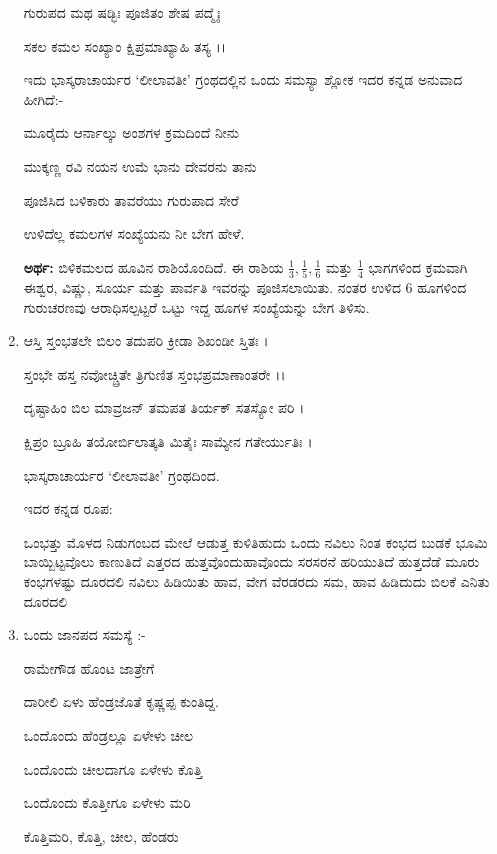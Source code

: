 \begin{enumerate}
 ಗುರುಪದ ಮಥ ಷಡ್ಭಿಃ ಪೂಜಿತಂ ಶೇಷ ಪದ್ಮೈಃ 
 
 ಸಕಲ ಕಮಲ ಸಂಖ್ಯಾಂ ಕ್ಷಿಪ್ರಮಾಖ್ಯಾಹಿ ತಸ್ಯ ।।
 
 \medskip
 
 ಇದು ಭಾಸ್ಕರಾಚಾರ್ಯರ ‘ಲೀಲಾವತೀ’ ಗ್ರಂಥದಲ್ಲಿನ ಒಂದು ಸಮಸ್ಯಾ ಶ್ಲೋಕ ಇದರ ಕನ್ನಡ ಅನುವಾದ ಹೀಗಿದೆ:-
 
 \smallskip
 
 ಮೂರೈದು ಆರ್ನಾಲ್ಕು ಅಂಶಗಳ ಕ್ರಮದಿಂದೆ ನೀನು
 
 ಮುಕ್ಕಣ್ಣ ರವಿ ನಯನ ಉಮೆ ಭಾನು ದೇವರನು ತಾನು 
 
 ಪೂಜಿಸಿದ ಬಳಿಕಾರು ತಾವರೆಯು ಗುರುಪಾದ ಸೇರೆ 
 
 ಉಳಿದೆಲ್ಲ ಕಮಲಗಳ ಸಂಖ್ಯೆಯನು ನೀ ಬೇಗ ಹೇಳೆ.
 
 \smallskip
 {\bf ಅರ್ಥ:} ಬಿಳಿಕಮಲದ ಹೂವಿನ ರಾಶಿಯೊಂದಿದೆ. ಈ ರಾಶಿಯ $\frac{1}{3}, \frac{1}{5}, \frac{1}{6}$ ಮತ್ತು $\frac{1}{4}$ ಭಾಗಗಳಿಂದ ಕ್ರಮವಾಗಿ ಈಶ್ವರ, ವಿಷ್ಣು, ಸೂರ್ಯ ಮತ್ತು ಪಾರ್ವತಿ ಇವರನ್ನು ಪೂಜಿಸಲಾಯಿತು. ನಂತರ ಉಳಿದ 6 ಹೂಗಳಿಂದ ಗುರುಚರಣವು ಆರಾಧಿಸಲ್ಪಟ್ಟರೆ ಒಟ್ಟು ಇದ್ದ ಹೂಗಳ ಸಂಖ್ಯೆಯನ್ನು ಬೇಗ ತಿಳಿಸು. 
 
 \eject
 
 \item ಆಸ್ತಿ ಸ್ತಂಭತಲೇ ಬಿಲಂ ತದುಪರಿ ಕ್ರೀಡಾ ಶಿಖಂಡೀ ಸ್ತಿತಃ ।
 
 ಸ್ತಂಭೇ ಹಸ್ತ ನವೋಚ್ಚ್ರಿತೇ ತ್ರಿಗುಣಿತ ಸ್ತಂಭಪ್ರಮಾಣಾಂತರೇ ।।
 
 ದೃಷ್ಟಾಹಿಂ ಬಿಲ ಮಾವ್ರಜನ್ ತಮಪತ ತಿರ್ಯಕ್ ಸತಸ್ಯೋ ಪರಿ ।
 
 ಕ್ಷಿಪ್ರಂ ಬ್ರೂಹಿ ತಯೋರ್ಬಿಲಾತ್ಕತಿ ಮಿತೈಃ ಸಾಮ್ಯೇನ ಗತೇರ್ಯುತಿಃ ।
 
 \hfill ಭಾಸ್ಕರಾಚಾರ್ಯರ ‘ಲೀಲಾವತೀ’ ಗ್ರಂಥದಿಂದ.
  
 \smallskip
 
 ಇದರ ಕನ್ನಡ ರೂಪ:
 
 \smallskip
 
 ಒಂಭತ್ತು ಮೊಳದ ನಿಡುಗಂಬದ ಮೇಲೆ ಆಡುತ್ತ ಕುಳಿತಿಹುದು ಒಂದು ನವಿಲು ನಿಂತ ಕಂಭದ ಬುಡಕೆ ಭೂಮಿ ಬಾಯ್ಬಿಟ್ಟವೊಲು ಕಾಣುತಿದೆ ಎತ್ತರದ ಹುತ್ತವೊಂದು\break ಹಾವೊಂದು ಸರಸರನೆ ಹರಿಯುತಿದೆ ಹುತ್ತದೆಡೆ ಮೂರು ಕಂಭಗಳಷ್ಟು ದೂರದಲಿ ನವಿಲು ಹಿಡಿಯಿತು ಹಾವ, ವೇಗ ವೆರಡರದು ಸಮ, ಹಾವ ಹಿಡಿದುದು ಬಿಲಕೆ ಎನಿತು ದೂರದಲಿ
 
 \item ಒಂದು ಜಾನಪದ ಸಮಸ್ಯೆ :-
 
\smallskip

ರಾಮೇಗೌಡ ಹೊಂಟ ಜಾತ್ರೇಗೆ 
 
ದಾರೀಲಿ ಏಳು ಹೆಂಡ್ರಜೊತೆ ಕೃಷ್ಣಪ್ಪ ಕುಂತಿದ್ದ. 
 
ಒಂದೊಂದು ಹೆಂಡ್ರಲ್ಲೂ ಏಳೇಳು ಚೀಲ 
 
ಒಂದೊಂದು ಚೀಲದಾಗೂ ಏಳೇಳು ಕೊತ್ತಿ 
 
ಒಂದೊಂದು ಕೊತ್ತೀಗೂ ಏಳೇಳು ಮರಿ

ಕೊತ್ತಿಮರಿ, ಕೊತ್ತಿ, ಚೀಲ, ಹೆಂಡರು 


\end{enumerate}

